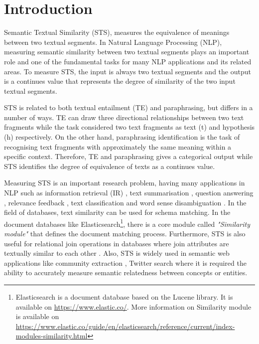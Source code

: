 \chapter{\label{cha:sts_introduction}Introduction}

Semantic Textual Similarity (STS), measures the equivalence of meanings between two textual segments. In Natural Language Processing (NLP), measuring semantic similarity between two textual segments plays an important role and one of the fundamental tasks for many NLP applications and its related areas. To measure STS, the input is always two textual segments and the output is a continues value that represents the degree of similarity of the two input textual segments. 


STS is related to both textual entailment (TE) and paraphrasing, but differs in a number of ways. TE can draw three directional relationships between two text fragments while the task considered two text fragments as text (t) and hypothesis (h) respectively. On the other hand, paraphrasing identification is the task of recognising text fragments with approximately the same meaning within a specific context. Therefore, TE and paraphrasing gives a categorical output while STS identifies the degree of equivalence of texts as a continues value. 

 Measuring STS is an important research problem, having many applications in NLP such as information retrieval (IR) \cite{10.1145/1097047.1097051, 5571521}, text summarisation \cite{ALIGULIYEV20097764, SCHALLEHN2004361}, question answering \cite{mohler-etal-2011-learning}, relevance feedback \cite{WANG2020102342}, text classification \cite{10.1007/978-3-642-41278-3_74, 10.1007/978-3-319-11749-2_8} and word sense disambiguation \cite{10.1007/978-3-642-17432-2_44}. In the field of databases, text similarity can be used for schema matching. In the document databases like Elasticsearch\footnote{Elasticsearch is a document database based on the Lucene library. It is available on \url{https://www.elastic.co/}. More information on Similarity module is available on \url{https://www.elastic.co/guide/en/elasticsearch/reference/current/index-modules-similarity.html}}, there is a core module called \textit{"Similarity module"} that defines the document matching process. Furthermore, STS is also useful for relational join operations in databases where join attributes are textually similar to each other \cite{10.1145/352595.352598, SCHALLEHN2004361}. Also, STS is widely used in semantic web applications like community extraction \cite{10.1007/978-3-642-14589-6_33}, Twitter search \cite{feng-etal-2013-twitter} where it is required the ability to accurately measure semantic relatedness between concepts or entities.
 
